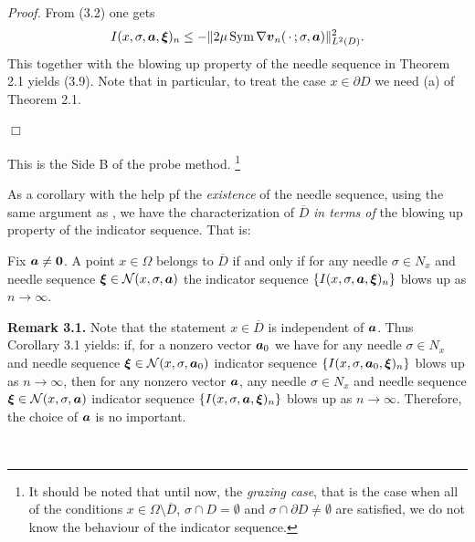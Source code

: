 {\it\noindent Proof.}
From (3.2) one gets
$$\displaystyle
I(x,\sigma,\mbox{\boldmath $a$},\mbox{\boldmath $\xi$})_n
\le
-\Vert 2\mu\,\text{Sym}\,\nabla\mbox{\boldmath $v$}_n(\,\cdot\,;\sigma,\mbox{\boldmath $a$})\Vert_{L^2(D)}^2.
$$
This together with the  blowing up property of the needle sequence in Theorem 2.1 yields (3.9).
Note that in particular, to treat the case $x\in\partial D$ we need (a) of  Theorem 2.1.


\noindent
$\Box$


\noindent
This is the Side B of the probe method. 
\footnote{It should be noted that until now, the {\it grazing case}, that is the case when all of the conditions
$x\in\Omega\setminus\overline{D}$, $\sigma\cap D=\emptyset$ and $\sigma\cap\partial D\not=\emptyset$ 
are satisfied, we do not know the behaviour of  the indicator sequence.}
 
As a corollary with the help pf the {\it existence} of the needle sequence,
using the same argument as \cite{IPS},
we have the characterization of $\overline{D}$ {\it in terms of} the blowing up property of the indicator sequence.
That is: 


  Fix $\mbox{\boldmath $a$}\not=\mbox{\boldmath $0$}$.
A point $x\in\Omega$ belongs to $\overline{D}$
if and only if for any needle $\sigma\in N_x$ and needle 
sequence $\mbox{\boldmath $\xi$}\in{\cal N}(x,\sigma,\mbox{\boldmath $a$})$ the
indicator sequence $\{I(x,\sigma,\mbox{\boldmath $a$},\mbox{\boldmath $\xi$})_n\}$
blows up as $n\rightarrow\infty$.


\endproclaim


{\bf\noindent Remark 3.1.}
Note that the statement $x\in\overline{D}$ is independent of $\mbox{\boldmath $a$}$.
Thus Corollary 3.1 yields:
if, for a nonzero vector $\mbox{\boldmath $a$}_0$ we have for any needle $\sigma\in N_x$ and needle 
sequence $\mbox{\boldmath $\xi$}\in{\cal N}(x,\sigma,\mbox{\boldmath $a$}_0)$
indicator sequence $\{I(x,\sigma,\mbox{\boldmath $a$}_0,\mbox{\boldmath $\xi$})_n\}$
blows up as $n\rightarrow\infty$,
then for any nonzero vector $\mbox{\boldmath $a$}$, any needle $\sigma\in N_x$ and needle 
sequence $\mbox{\boldmath $\xi$}\in{\cal N}(x,\sigma,\mbox{\boldmath $a$})$
indicator sequence $\{I(x,\sigma,\mbox{\boldmath $a$},\mbox{\boldmath $\xi$})_n\}$
blows up as $n\rightarrow\infty$.
Therefore, the choice of $\mbox{\boldmath $a$}$ is no important.

$\quad$

